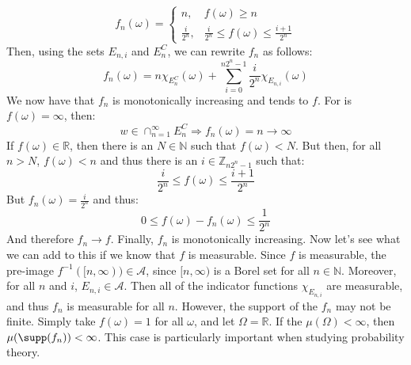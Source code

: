         \begin{equation}
            f_{n}(\omega)=
            \begin{cases}
                n,&f(\omega)\geq{n}\\
                \frac{i}{2^{n}},&\frac{i}{2^{n}}
                    \leq{f}(\omega)\leq\frac{i+1}{2^{n}}
            \end{cases}
        \end{equation}
        Then, using the sets $E_{n,i}$ and $E_{n}^{C}$, we can rewrite $f_{n}$
        as follows:
        \begin{equation}
            f_{n}(\omega)=n\chi_{E_{n}^{C}}(\omega)+
                \sum_{i=0}^{n2^{n}-1}\frac{i}{2^{n}}\chi_{E_{n,i}}(\omega)
        \end{equation}
        We now have that $f_{n}$ is monotonically increasing and tends to $f$.
        For is $f(\omega)=\infty$, then:
        \begin{equation}
            w\in\cap_{n=1}^{\infty}E_{n}^{C}
            \Rightarrow
            f_{n}(\omega)=n\rightarrow\infty
        \end{equation}
        If $f(\omega)\in\mathbb{R}$, then there is an $N\in\mathbb{N}$ such that
        $f(\omega)<N$. But then, for all $n>N$, $f(\omega)<n$ and thus there is
        an $i\in\mathbb{Z}_{n2^{n}-1}$ such that:
        \begin{equation}
            \frac{i}{2^{n}}\leq{f}(\omega)\leq\frac{i+1}{2^{n}}
        \end{equation}
        But $f_{n}(\omega)=\frac{i}{2^{n}}$ and thus:
        \begin{equation}
            0\leq{f}(\omega)-f_{n}(\omega)\leq\frac{1}{2^{n}}
        \end{equation}
        And therefore $f_{n}\rightarrow{f}$. Finally, $f_{n}$ is monotonically
        increasing. Now let's see what we can add to this if we know that $f$
        is measurable. Since $f$ is measurable, the pre-image
        $f^{-1}([n,\infty))\in\mathcal{A}$, since $[n,\infty)$ is a Borel set
        for all $n\in\mathbb{N}$. Moreover, for all $n$ and $i$,
        $E_{n,i}\in\mathcal{A}$. Then all of the indicator functions
        $\chi_{E_{n,i}}$ are measurable, and thus $f_{n}$ is measurable for all
        $n$. However, the support of the $f_{n}$ may not be finite. Simply take
        $f(\omega)=1$ for all $\omega$, and let $\Omega=\mathbb{R}$. If the
        $\mu(\Omega)<\infty$, then $\mu(\supp(f_{n}))<\infty$. This case is
        particularly important when studying probability theory.
